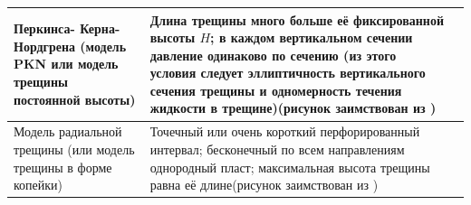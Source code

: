 \begin{longtable}[l]{|L{2.2cm}|m{7.3cm}|L{6.2cm}|}
	Перкинса- Керна- Нордгрена (модель PKN или модель трещины постоянной высоты)&Длина трещины много больше её фиксированной высоты $H$; в каждом вертикальном сечении давление одинаково по сечению (из этого условия следует эллиптичность вертикального сечения трещины и одномерность течения жидкости в трещине)\break\hfill\break (рисунок заимствован из \cite{adachi})&\hfill\break{}\hfill\break\\ \hline
	Модель радиальной трещины (или модель трещины в форме копейки)&Точечный или очень короткий перфорированный интервал; бесконечный по всем направлениям однородный пласт; максимальная высота трещины равна её длине\break\hfill\break (рисунок заимствован из \cite{adachi})&\hfill\break{}\hfill\break\\ \hline

\end{longtable}
